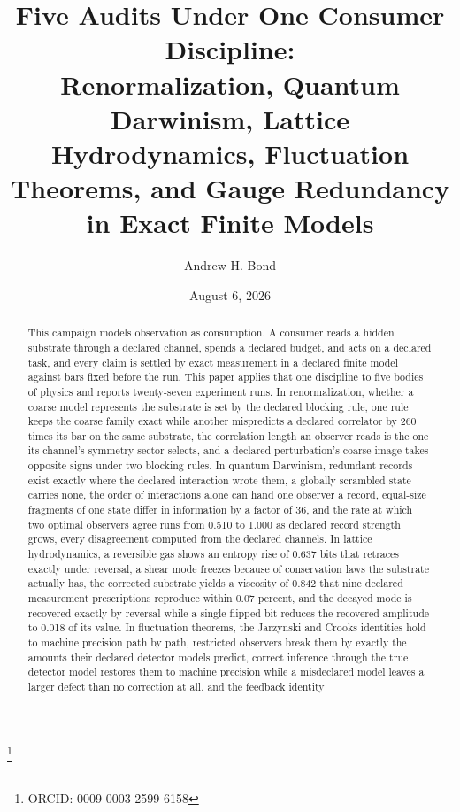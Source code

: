 \documentclass[aps,pre,reprint,nofootinbib,floatfix]{revtex4-2}
\begin{document}
\title{Five Audits Under One Consumer Discipline:\\
Renormalization, Quantum Darwinism, Lattice Hydrodynamics,
Fluctuation Theorems, and Gauge Redundancy in Exact Finite Models}

\author{Andrew H. Bond}
\thanks{ORCID: 0009-0003-2599-6158}
\date{August 6, 2026}

\begin{abstract}
This campaign models observation as consumption.  A consumer reads a
hidden substrate through a declared channel, spends a declared
budget, and acts on a declared task, and every claim is settled by
exact measurement in a declared finite model against bars fixed
before the run.  This paper applies that one discipline to five
bodies of physics and reports twenty-seven experiment runs.  In
renormalization, whether a coarse model represents the substrate is
set by the declared blocking rule, one rule keeps the coarse family
exact while another mispredicts a declared correlator by 260 times
its bar on the same substrate, the correlation length an observer
reads is the one its channel's symmetry sector selects, and a
declared perturbation's coarse image takes opposite signs under
two blocking rules.  In quantum Darwinism, redundant records exist
exactly where the declared interaction wrote them, a globally
scrambled state carries none, the order of interactions alone can
hand one observer a record, equal-size fragments of one state differ
in information by a factor of 36, and the rate at which two optimal
observers agree runs from 0.510 to 1.000 as declared record strength
grows, every disagreement computed from the declared channels.  In
lattice hydrodynamics, a reversible gas shows an entropy rise of
0.637 bits that retraces exactly under reversal, a shear mode
freezes because of conservation laws the substrate actually has,
the corrected substrate yields a viscosity of 0.842 that nine
declared measurement prescriptions reproduce within 0.07 percent,
and the decayed mode is recovered exactly by reversal
while a single flipped bit reduces the recovered amplitude to 0.018
of its value.  In fluctuation theorems, the Jarzynski and Crooks
identities hold to machine precision path by path, restricted
observers break them by exactly the amounts their declared detector
models predict, correct inference through the true detector model
restores them to machine precision while a misdeclared model leaves
a larger defect than no correction at all, and the feedback identity

\end{abstract}
\end{document}
